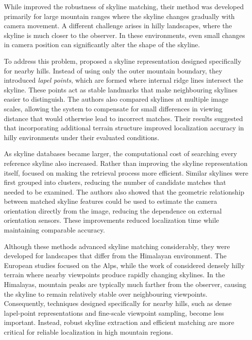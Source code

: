 While \cite{chen2015camera} improved the robustness of skyline matching, their method was developed primarily for large mountain ranges where the skyline changes gradually with camera movement. A different challenge arises in hilly landscapes, where the skyline is much closer to the observer. In these environments, even small changes in camera position can significantly alter the shape of the skyline.

To address this problem, \cite{pan2020camera} proposed a skyline representation designed specifically for nearby hills. Instead of using only the outer mountain boundary, they introduced \emph{lapel points}, which are formed where internal ridge lines intersect the skyline. These points act as stable landmarks that make neighbouring skylines easier to distinguish. The authors also compared skylines at multiple image scales, allowing the system to compensate for small differences in viewing distance that would otherwise lead to incorrect matches. Their results suggested that incorporating additional terrain structure improved localization accuracy in hilly environments under their evaluated conditions.

As skyline databases became larger, the computational cost of searching every reference skyline also increased. Rather than improving the skyline representation itself, \cite{pan2021fast} focused on making the retrieval process more efficient. Similar skylines were first grouped into clusters, reducing the number of candidate matches that needed to be examined. The authors also showed that the geometric relationship between matched skyline features could be used to estimate the camera orientation directly from the image, reducing the dependence on external orientation sensors. These improvements reduced localization time while maintaining comparable accuracy.

Although these methods advanced skyline matching considerably, they were developed for landscapes that differ from the Himalayan environment. The European studies focused on the Alps, while the work of \cite{pan2021fast} considered densely hilly terrain where nearby viewpoints produce rapidly changing skylines. In the Himalayas, mountain peaks are typically much farther from the observer, causing the skyline to remain relatively stable over neighbouring viewpoints. Consequently, techniques designed specifically for nearby hills, such as dense lapel-point representations and fine-scale viewpoint sampling, become less important. Instead, robust skyline extraction and efficient matching are more critical for reliable localization in high mountain regions.

